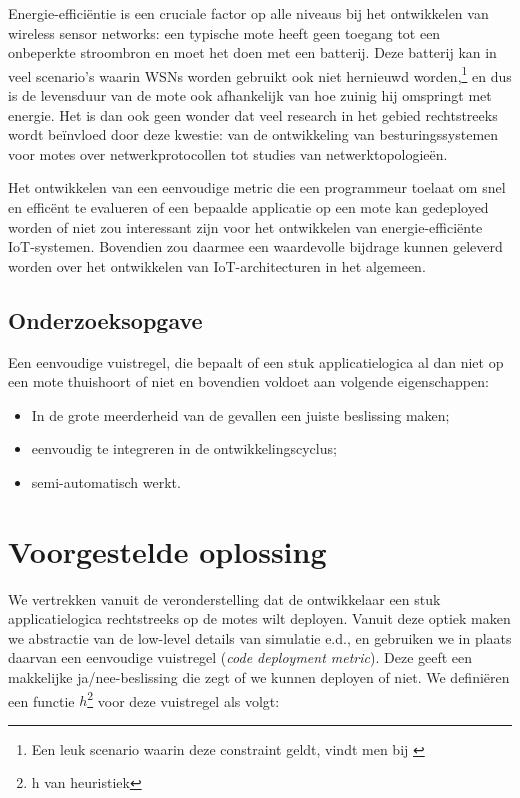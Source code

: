 \documentclass{article}
\begin{document}
Energie-effici\"entie is een cruciale factor op alle niveaus bij het ontwikkelen
van wireless sensor networks: een typische mote heeft geen toegang tot een
onbeperkte stroombron en moet het doen met een batterij. Deze batterij kan in
veel scenario's waarin WSNs worden gebruikt ook niet hernieuwd
worden,\footnote{Een leuk scenario waarin deze constraint geldt, vindt men bij
\cite{mainwaring2002wireless}} en dus is de levensduur van de mote ook
afhankelijk van hoe zuinig hij omspringt met energie. Het is dan ook geen wonder
dat veel research in het gebied rechtstreeks wordt be\"invloed door deze
kwestie: van de ontwikkeling van besturingssystemen voor motes over
netwerkprotocollen tot studies van netwerktopologie\"en.

Het ontwikkelen van een eenvoudige metric die een programmeur toelaat om snel en
effic\"ent te evalueren of een bepaalde applicatie op een mote kan gedeployed
worden of niet zou interessant zijn voor het ontwikkelen van
energie-effici\"ente IoT-systemen. Bovendien zou daarmee een waardevolle
bijdrage kunnen geleverd worden over het ontwikkelen van IoT-architecturen in
het algemeen.

\subsection{Onderzoeksopgave}

Een eenvoudige vuistregel, die bepaalt of een stuk applicatielogica al dan niet op een mote thuishoort of niet en bovendien voldoet aan volgende eigenschappen:
\begin{itemize}
\item In de grote meerderheid van de gevallen een juiste beslissing maken;
\item eenvoudig te integreren in de ontwikkelingscyclus;
\item semi-automatisch werkt.
\end{itemize}

\section{Voorgestelde oplossing}
We vertrekken vanuit de veronderstelling dat de ontwikkelaar een stuk
applicatielogica rechtstreeks op de motes wilt deployen. Vanuit deze optiek
maken we abstractie van de low-level details van simulatie e.d., en gebruiken we
in plaats daarvan een eenvoudige vuistregel (\textit{code deployment
metric}). Deze geeft een makkelijke ja/nee-beslissing die zegt of we kunnen
deployen of niet. We defini\"eren een functie $h$\footnote{h van heuristiek} voor deze vuistregel als
volgt:
\end{document}

